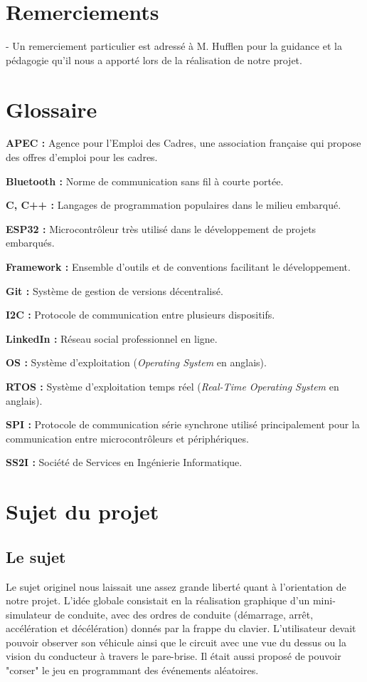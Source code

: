 \documentclass[a4paper,12pt]{report}
\begin{document}
    \newpage
    \section*{Remerciements}
    - Un remerciement particulier est adressé à M. Hufflen pour la guidance et la pédagogie qu'il nous a apporté lors de la réalisation de notre projet.

    \newpage
    \tableofcontents
    \newpage


    \newpage
    \section*{Glossaire}

    \textbf{APEC :} Agence pour l'Emploi des Cadres, une association française qui propose des offres d'emploi pour les cadres.

    \textbf{Bluetooth :} Norme de communication sans fil à courte portée.

    \textbf{C, C++ :} Langages de programmation populaires dans le milieu embarqué.

    \textbf{ESP32 :} Microcontrôleur très utilisé dans le développement de projets embarqués.

    \textbf{Framework :} Ensemble d'outils et de conventions facilitant le développement.

    \textbf{Git :} Système de gestion de versions décentralisé.

    \textbf{I2C :} Protocole de communication entre plusieurs dispositifs.

    \textbf{LinkedIn :} Réseau social professionnel en ligne.

    \textbf{OS :} Système d'exploitation (\textit{Operating System} en anglais).

    \textbf{RTOS :} Système d'exploitation temps réel (\textit{Real-Time Operating System} en anglais).

    \textbf{SPI :} Protocole de communication série synchrone utilisé principalement pour la communication entre microcontrôleurs et périphériques.

    \textbf{SS2I :} Société de Services en Ingénierie Informatique.

    \newpage
    \section{Sujet du projet}

    \subsection{Le sujet}
    Le sujet originel nous laissait une assez grande liberté quant à l'orientation de notre projet. L'idée globale consistait en la réalisation graphique d'un mini-simulateur de conduite, avec des ordres de conduite (démarrage, arrêt, accélération et décélération) donnés par la frappe du clavier. L'utilisateur devait pouvoir observer son véhicule ainsi que le circuit avec une vue du dessus ou la vision du conducteur à travers le pare-brise. Il était aussi proposé de pouvoir "corser" le jeu en programmant des événements aléatoires.
\end{document}

